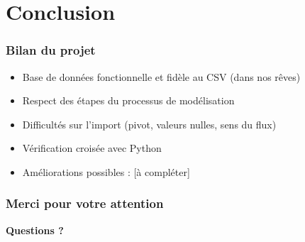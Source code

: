 \documentclass[11pt]{beamer}
\begin{document}
\section{Conclusion}
\begin{frame}
  \frametitle{Bilan du projet}
  \begin{itemize}
    \item Base de données fonctionnelle et fidèle au CSV (dans nos rêves)
    \item Respect des étapes du processus de modélisation
    \item Difficultés sur l’import (pivot, valeurs nulles, sens du flux)
    \item Vérification croisée avec Python
    \item Améliorations possibles : [à compléter]
  \end{itemize}
\end{frame}

\begin{frame}
  \frametitle{Merci pour votre attention}
  \begin{center}
    \huge \textbf{Questions ?}
  \end{center}
\end{frame}
\end{document}
